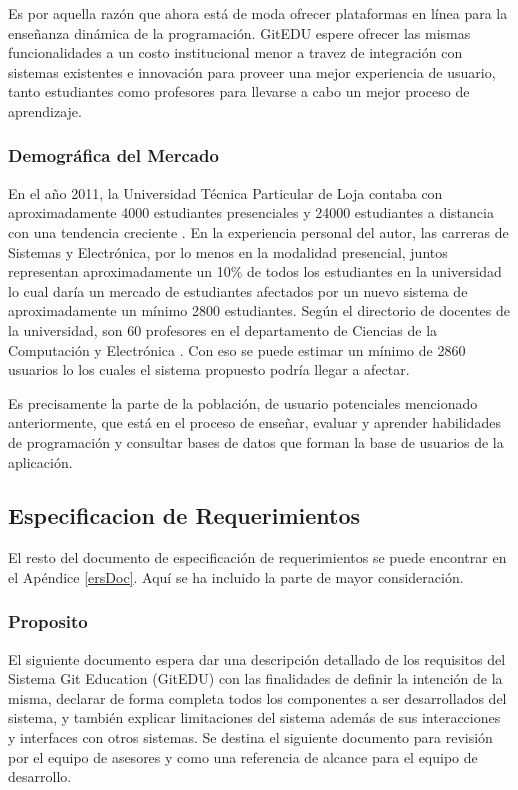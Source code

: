 Es por aquella razón que ahora está de moda ofrecer plataformas en línea para la enseñanza dinámica de la programación. GitEDU espere ofrecer las mismas funcionalidades a un costo institucional menor a travez de integración con sistemas existentes e innovación para proveer una mejor experiencia de usuario, tanto estudiantes como profesores para llevarse a cabo un mejor proceso de aprendizaje.

\subsubsection{Demográfica del Mercado}
En el año 2011, la Universidad Técnica Particular de Loja contaba con aproximadamente 4000 estudiantes presenciales y 24000 estudiantes a distancia con una tendencia creciente \citep{UTPL-Datos-Estadisticos}. En la experiencia personal del autor, las carreras de Sistemas y Electrónica, por lo menos en la modalidad presencial, juntos representan aproximadamente un 10\% de todos los estudiantes en la universidad lo cual daría un mercado de estudiantes afectados por un nuevo sistema de aproximadamente un mínimo 2800 estudiantes. Según el directorio de docentes de la universidad, son 60 profesores en el departamento de Ciencias de la Computación y Electrónica \citep{UTPL-Directorio-Docentes}. Con eso se puede estimar un mínimo de 2860 usuarios lo los cuales el sistema propuesto podría llegar a afectar.

Es precisamente la parte de la población, de usuario potenciales mencionado anteriormente, que está en el proceso de enseñar, evaluar y aprender habilidades de programación y consultar bases de datos que forman la base de usuarios de la aplicación.

\subsection{Especificacion de Requerimientos}
El resto del documento de especificación de requerimientos se puede encontrar en el Apéndice \ref{ersDoc}. Aquí se ha incluido la parte de mayor consideración.

\subsubsection{Proposito}
El siguiente documento espera dar una descripción detallado de los requisitos del Sistema Git Education (GitEDU) con las finalidades de definir la intención de la misma, declarar de forma completa todos los componentes a ser desarrollados del sistema, y también explicar limitaciones del sistema además de sus interacciones y interfaces con otros sistemas. Se destina el siguiente documento para revisión por el equipo de asesores y como una referencia de alcance para el equipo de desarrollo.

